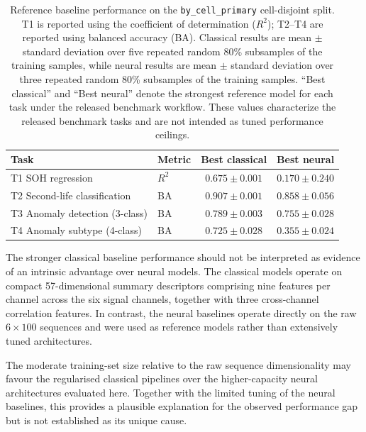 \documentclass[11pt]{article}
\begin{document}
\begin{table}[!htbp]
\centering
\caption{Reference baseline performance on the
\texttt{by\_cell\_primary} cell-disjoint split. T1 is reported using the
coefficient of determination ($R^2$); T2--T4 are reported using balanced
accuracy (BA). Classical results are mean $\pm$ standard deviation over
five repeated random 80\% subsamples of the training samples, while neural results are
mean $\pm$ standard deviation over three repeated random 80\% subsamples
of the training samples. ``Best classical'' and ``Best neural'' denote the strongest reference
model for each task under the released benchmark workflow. These values
characterize the released benchmark tasks and are not intended as tuned
performance ceilings.}
\label{tab:baseline}
\small
\begin{tabular}{@{}llcc@{}}
\toprule
Task & Metric & Best classical & Best neural \\
\midrule
T1 SOH regression
& $R^2$ & $0.675\pm0.001$ & $0.170\pm0.240$ \\

T2 Second-life classification
& BA & $0.907\pm0.001$ & $0.858\pm0.056$ \\

T3 Anomaly detection (3-class)
& BA & $0.789\pm0.003$ & $0.755\pm0.028$ \\

T4 Anomaly subtype (4-class)
& BA & $0.725\pm0.028$ & $0.355\pm0.024$ \\
\bottomrule
\end{tabular}
\end{table}

The stronger classical baseline performance should not be interpreted as evidence of an intrinsic advantage over neural models. The classical models operate on compact 57-dimensional summary descriptors comprising nine features per channel across the six signal channels, together with three cross-channel correlation features. In contrast, the neural baselines operate directly on the raw $6\times100$ sequences and were used as reference models rather than extensively tuned architectures.

The moderate training-set size relative to the raw sequence dimensionality may favour the regularised classical pipelines over the higher-capacity neural architectures evaluated here. Together with the limited tuning of the neural baselines, this provides a plausible explanation for the observed performance gap but is not established as its unique cause.
\end{document}
